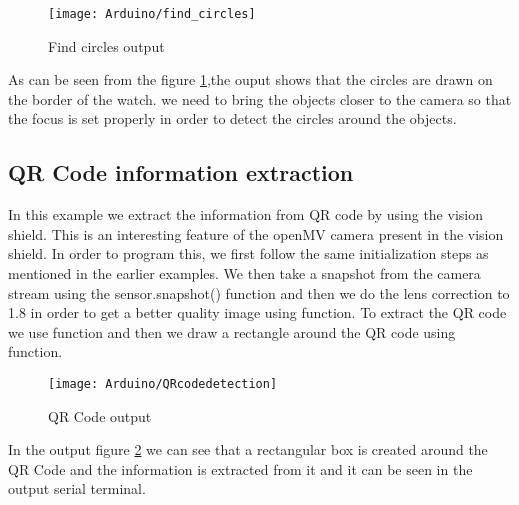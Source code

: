 \begin{figure}[H]
	\centering
	\texttt{[image: Arduino/find\_circles]}
	\caption{Find circles output}
	\label{figure 6.12}
\end{figure}
As can be seen from the figure \ref{figure 6.12},the ouput shows that the circles are drawn on the border of the watch. we need to bring the objects closer to the camera so that the focus is set properly in order to detect the circles around the objects.
  
\subsection{QR Code information extraction}

In this example we extract the information from QR code by using the vision shield.  This is an interesting feature of the openMV camera present in the vision shield. In order to program this, we first follow the same initialization steps as mentioned in the earlier examples.  We then take a snapshot from the camera stream using the sensor.snapshot() function and then we do the lens correction to 1.8 in order to get a better quality image using  function.  To extract the QR code we use  function and then we draw a rectangle around the QR code using  function.

\begin{figure}[H]
	\centering
	\texttt{[image: Arduino/QRcodedetection]}
	\caption{QR Code output}
	\label{figure 6.13}
\end{figure}

In the output figure \ref{figure 6.13} we can see that a rectangular box is created around the QR Code and the information is extracted from it and it can be seen in the output serial terminal.



